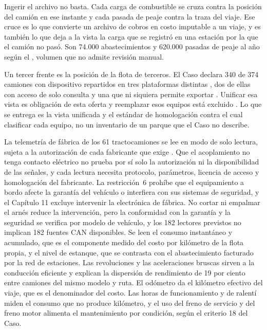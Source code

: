 Ingerir el archivo no basta. Cada carga de combustible se cruza contra la posición del camión en ese
instante y cada pasada de peaje contra la traza del viaje. Ese cruce es lo que convierte un archivo de
cobros en costo imputable a un viaje, y es también lo que deja a la vista la carga que se registró en
una estación por la que el camión no pasó. Son 74.000 abastecimientos y 620.000 pasadas de peaje al año
según el , volumen que no admite revisión manual.

Un tercer frente es la posición de la flota de terceros. El Caso declara 340 de 374 camiones con
dispositivo repartidos en tres plataformas distintas , dos de ellas con acceso
de solo consulta y una que ni siquiera permite exportar . Unificar esa vista es
obligación de esta oferta y reemplazar esos equipos está excluido . Lo que se
entrega es la vista unificada y el estándar de homologación contra el cual clasificar cada equipo, no
un inventario de un parque que el Caso no describe.

La telemetría de fábrica de los 61 tractocamiones se lee en modo de solo lectura, sujeta a la
autorización de cada fabricante que exige . Que el acoplamiento no tenga contacto
eléctrico no prueba por sí solo la autorización ni la disponibilidad de las señales, y cada lectura
necesita protocolo, parámetros, licencia de acceso y homologación del fabricante. La restricción~6
prohíbe que el equipamiento a bordo afecte la garantía del vehículo o interfiera con sus sistemas de
seguridad, y el Capítulo 11 excluye intervenir la electrónica de fábrica. No cortar ni empalmar el arnés
reduce la intervención, pero la conformidad con la garantía y la seguridad se verifica por modelo de
vehículo, y los 182 lectores previstos no implican 182 fuentes CAN disponibles. Se leen el consumo
instantáneo y acumulado, que es el componente medido del costo por kilómetro de la flota propia, y el
nivel de estanque, que se contrasta con el abastecimiento facturado por la red de estaciones. Las
revoluciones y las aceleraciones bruscas sirven a la conducción eficiente y explican la dispersión de
rendimiento de 19 por ciento entre camiones del mismo modelo y ruta. El odómetro da el kilómetro
efectivo del viaje, que es el denominador del costo. Las horas de funcionamiento y de ralentí miden el
consumo que no produce kilómetro, y el uso del freno de servicio y del freno motor alimenta el
mantenimiento por condición, según el criterio 18 del Caso.

